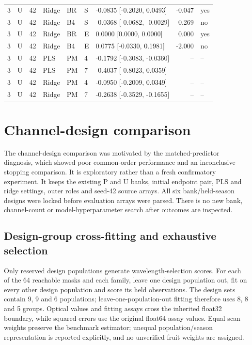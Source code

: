 \documentclass[10pt,a4paper]{article}
\begin{document}
\begin{longtable}{rlrllllrl}
3 & U & 42 & Ridge & BR & S & -0.0835 [-0.2020, 0.0493] & -0.047 & yes \\
3 & U & 42 & Ridge & B4 & S & -0.0368 [-0.0682, -0.0029] & 0.269 & no \\
3 & U & 42 & Ridge & BR & E & 0.0000 [0.0000, 0.0000] & 0.000 & yes \\
3 & U & 42 & Ridge & B4 & E & 0.0775 [-0.0330, 0.1981] & -2.000 & no \\
3 & U & 42 & PLS & PM & 4 & -0.1792 [-0.3083, -0.0360] & -- & -- \\
3 & U & 42 & PLS & PM & 7 & -0.4037 [-0.8023, 0.0359] & -- & -- \\
3 & U & 42 & Ridge & PM & 4 & -0.0950 [-0.2009, 0.0349] & -- & -- \\
3 & U & 42 & Ridge & PM & 7 & -0.2638 [-0.3529, -0.1655] & -- & -- \\
\end{longtable}
\endgroup

\section{Channel-design comparison}
The channel-design comparison was motivated by the matched-predictor diagnosis, which showed poor common-order performance and an inconclusive stopping comparison. It is exploratory rather than a fresh confirmatory experiment. It keeps the existing P and U banks, initial endpoint pair, PLS and ridge settings, outer roles and seed-42 source arrays. All six bank/held-season designs were locked before evaluation arrays were parsed. There is no new bank, channel-count or model-hyperparameter search after outcomes are inspected.

\subsection{Design-group cross-fitting and exhaustive selection}
Only reserved design populations generate wavelength-selection scores. For each of the 64 reachable masks and each family, leave one design population out, fit on every other design population and score its held observations. The design sets contain 9, 9 and 6 populations; leave-one-population-out fitting therefore uses 8, 8 and 5 groups. Optical values and fitting assays cross the inherited float32 boundary, while squared errors use the original float64 assay values. Equal scan weights preserve the benchmark estimator; unequal population/season representation is reported explicitly, and no unverified fruit weights are assigned.
\end{document}
